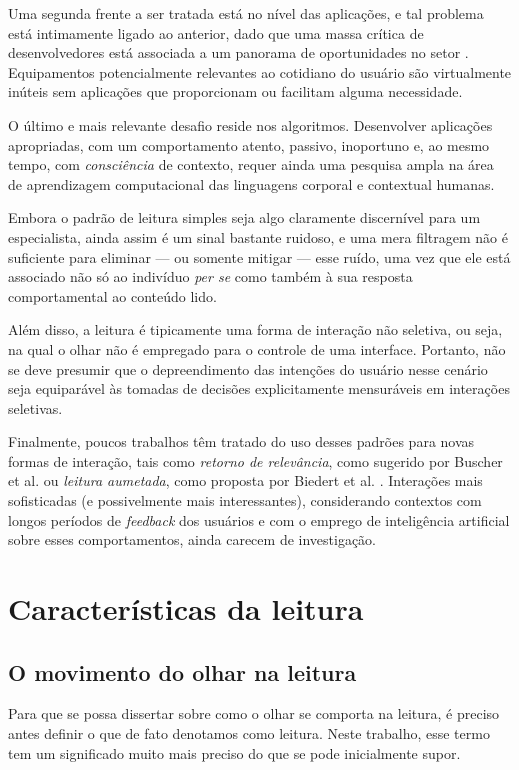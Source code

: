 \documentclass[12pt]{article}
\begin{document}
		Uma segunda frente a ser tratada está no nível das aplicações, e tal problema está intimamente ligado ao anterior, dado que uma massa crítica de desenvolvedores está associada a um panorama de oportunidades no setor \cite{Starner-2001}. Equipamentos potencialmente relevantes ao cotidiano do usuário são virtualmente inúteis sem aplicações que proporcionam ou facilitam alguma necessidade.
		
		O último e mais relevante desafio reside nos algoritmos. Desenvolver aplicações apropriadas, com um comportamento atento, passivo, inoportuno e, ao mesmo tempo, com \textit{consciência} de contexto, requer ainda uma pesquisa ampla na área de aprendizagem computacional das linguagens corporal e contextual humanas.
		
		Embora o padrão de leitura simples seja algo claramente discernível para um especialista, ainda assim é um sinal bastante ruidoso, e uma mera filtragem não é suficiente para eliminar --- ou somente mitigar --- esse ruído, uma vez que ele está associado não só ao indivíduo \textit{per se} como também à sua resposta comportamental ao conteúdo lido.
		
		Além disso, a leitura é tipicamente uma forma de interação não seletiva, ou seja, na qual o olhar não é empregado para o controle de uma interface. Portanto, não se deve presumir que o depreendimento das intenções do usuário nesse cenário seja equiparável às tomadas de decisões explicitamente mensuráveis em interações seletivas.
		
		Finalmente, poucos trabalhos têm tratado do uso desses padrões para novas formas de interação, tais como \textit{retorno de relevância}, como sugerido por Buscher et al. \cite{Buscher-2008} ou \textit{leitura aumetada}, como proposta por Biedert et al. \cite{Biedert-2010}. Interações mais sofisticadas (e possivelmente mais interessantes), considerando contextos com longos períodos de \textit{feedback} dos usuários e com o emprego de inteligência artificial sobre esses comportamentos, ainda carecem de investigação.
		\clearpage
	
	\section{Características da leitura}
	
		\subsection{O movimento do olhar na leitura}
		Para que se possa dissertar sobre como o olhar se comporta na leitura, é preciso antes definir o que de fato denotamos como leitura. Neste trabalho, esse termo tem um significado muito mais preciso do que se pode inicialmente supor.
		
\end{document}
